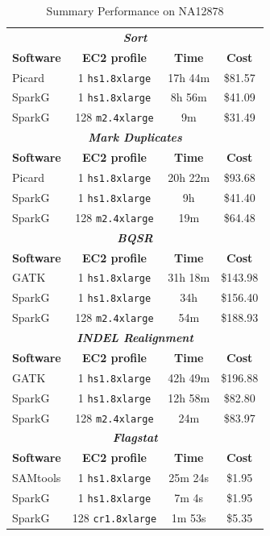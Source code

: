 \documentclass{acm_proc_article-sp}
\begin{document}
\begin{table}[h]
\caption{Summary Performance on NA12878}
\label{tab:overview}
\begin{center}
\begin{tabular}{ l c c c }
\hline
\multicolumn{4}{c}{\bf \textit{Sort}} \\
\bf Software & \bf EC2 profile & \bf Time & \bf Cost \\
\hline
Picard & 1 \texttt{hs1.8xlarge} & 17h 44m & \$81.57 \\
SparkG & 1 \texttt{hs1.8xlarge} & 8h 56m & \$41.09 \\
SparkG & 128 \texttt{m2.4xlarge} & 9m & \$31.49 \\
\hline
\multicolumn{4}{c}{\bf \textit{Mark Duplicates}} \\
\bf Software & \bf EC2 profile & \bf Time & \bf Cost  \\
\hline
Picard & 1 \texttt{hs1.8xlarge} & 20h 22m & \$93.68 \\
SparkG & 1 \texttt{hs1.8xlarge} & 9h & \$41.40 \\
SparkG & 128 \texttt{m2.4xlarge} & 19m & \$64.48 \\ 
\hline
\multicolumn{4}{c}{\bf \textit{BQSR}} \\
\bf Software & \bf EC2 profile & \bf Time & \bf Cost  \\
\hline
GATK & 1 \texttt{hs1.8xlarge} & 31h 18m & \$143.98 \\
SparkG & 1 \texttt{hs1.8xlarge} & 34h & \$156.40 \\
SparkG & 128 \texttt{m2.4xlarge} & 54m & \$188.93 \\
\hline
\multicolumn{4}{c}{\bf \textit{INDEL Realignment}} \\
\bf Software & \bf EC2 profile & \bf Time & \bf Cost  \\
\hline
GATK & 1 \texttt{hs1.8xlarge} & 42h 49m & \$196.88 \\
SparkG & 1 \texttt{hs1.8xlarge} & 12h 58m & \$82.80 \\
SparkG & 128 \texttt{m2.4xlarge} & 24m & \$83.97 \\
\hline
\multicolumn{4}{c}{\bf \textit{Flagstat}} \\
\bf Software & \bf EC2 profile & \bf Time & \bf Cost  \\
\hline
SAMtools & 1 \texttt{hs1.8xlarge} & 25m 24s & \$1.95 \\
SparkG & 1 \texttt{hs1.8xlarge} & 7m 4s & \$1.95 \\
SparkG & 128 \texttt{cr1.8xlarge} & 1m 53s & \$5.35 \\
\hline
\end{tabular}
\end{center}
\end{table}
\end{document}
